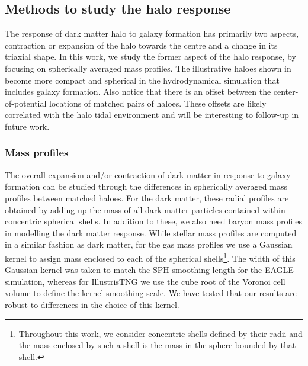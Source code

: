 \subsection{Methods to study the halo response}
\label{sec:method-ch:simbase}
The response of dark matter halo to galaxy formation has primarily two aspects, contraction or expansion of the halo towards the centre and a change in its triaxial shape. In this work, we study the former aspect of the halo response, by focusing on spherically averaged mass profiles. 
The illustrative haloes shown in  become more compact and spherical in the hydrodynamical simulation that includes galaxy formation.
Also notice that there is an offset between the center-of-potential locations of matched pairs of haloes. These offsets are likely correlated with the halo tidal environment and will be interesting to follow-up in future work.

\subsubsection{Mass profiles}
\label{subsec:massprofiles-ch:simbase}

The overall expansion and/or contraction of dark matter in response to galaxy formation can be studied through the differences in spherically averaged mass profiles between matched haloes. For the dark matter, these radial profiles are obtained by adding up the mass of all dark matter particles contained within concentric spherical shells. In addition to these, we also need baryon mass profiles in modelling the dark matter response. While stellar mass profiles are computed in a similar fashion as dark matter,
for the gas mass profiles we use a Gaussian kernel to assign mass enclosed to each of the spherical shells\footnote{Throughout this work, we consider concentric shells defined by their radii and the mass enclosed by such a shell is the mass in the sphere bounded by that shell.
}. 
The width of this Gaussian kernel was taken to match the SPH smoothing length for the EAGLE simulation, whereas for IllustrisTNG we use the cube root of the Voronoi cell volume to define the kernel smoothing scale. We have tested that our results are robust to differences in the choice of this kernel.


